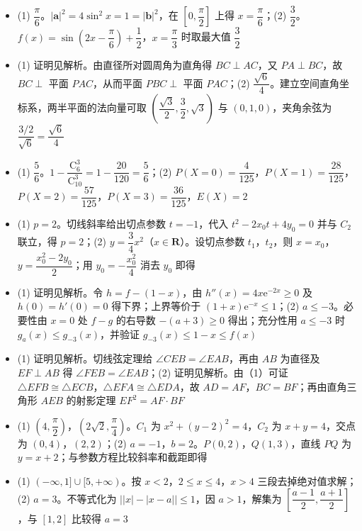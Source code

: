 \begin{itemize}[leftmargin=2.6em]
  \item[\textbf{17.}] (1) $\dfrac{\pi}6$。$|\boldsymbol a|^2=4\sin^2x=1=|\boldsymbol b|^2$，在 $\left[0,\dfrac{\pi}2\right]$ 上得 $x=\dfrac{\pi}6$；(2) $\dfrac32$。$f(x)=\sin\left(2x-\dfrac{\pi}6\right)+\dfrac12$，$x=\dfrac{\pi}3$ 时取最大值 $\dfrac32$
  \item[\textbf{18.}] (1) 证明见解析。由直径所对圆周角为直角得 $BC\perp AC$，又 $PA\perp BC$，故 $BC\perp$ 平面 $PAC$，从而平面 $PBC\perp$ 平面 $PAC$；(2) $\dfrac{\sqrt6}4$。建立空间直角坐标系，两半平面的法向量可取 $\left(\dfrac{\sqrt3}2,\dfrac32,\sqrt3\right)$ 与 $(0,1,0)$，夹角余弦为 $\dfrac{3/2}{\sqrt6}=\dfrac{\sqrt6}4$
  \item[\textbf{19.}] (1) $\dfrac56$。$1-\dfrac{\mathrm C_6^3}{\mathrm C_{10}^3}=1-\dfrac{20}{120}=\dfrac56$；(2) $P(X=0)=\dfrac4{125}$，$P(X=1)=\dfrac{28}{125}$，$P(X=2)=\dfrac{57}{125}$，$P(X=3)=\dfrac{36}{125}$，$E(X)=2$
  \item[\textbf{20.}] (1) $p=2$。切线斜率给出切点参数 $t=-1$，代入 $t^2-2x_0t+4y_0=0$ 并与 $C_2$ 联立，得 $p=2$；(2) $y=\dfrac34x^2$（$x\in\mathbf R$）。设切点参数 $t_1$，$t_2$，则 $x=x_0$，$y=\dfrac{x_0^2-2y_0}2$；用 $y_0=-\dfrac{x_0^2}4$ 消去 $y_0$ 即得
  \item[\textbf{21.}] (1) 证明见解析。令 $h=f-(1-x)$，由 $h''(x)=4x\mathrm e^{-2x}\geqslant0$ 及 $h(0)=h'(0)=0$ 得下界；上界等价于 $(1+x)\mathrm e^{-x}\leqslant1$；(2) $a\leqslant-3$。必要性由 $x=0$ 处 $f-g$ 的右导数 $-(a+3)\geqslant0$ 得出；充分性用 $a\leqslant-3$ 时 $g_a(x)\leqslant g_{-3}(x)$，并验证 $g_{-3}(x)\leqslant1-x\leqslant f(x)$
\end{itemize}

\begin{itemize}[leftmargin=2.6em]
  \item[\textbf{22.}] (1) 证明见解析。切线弦定理给 $\angle CEB=\angle EAB$，再由 $AB$ 为直径及 $EF\perp AB$ 得 $\angle FEB=\angle EAB$；(2) 证明见解析。由（1）可证 $\triangle EFB\cong\triangle ECB$，$\triangle EFA\cong\triangle EDA$，故 $AD=AF$，$BC=BF$；再由直角三角形 $AEB$ 的射影定理 $EF^2=AF\cdot BF$
  \item[\textbf{23.}] (1) $(4,\dfrac{\pi}2)$，$(2\sqrt2,\dfrac{\pi}4)$。$C_1$ 为 $x^2+(y-2)^2=4$，$C_2$ 为 $x+y=4$，交点为 $(0,4)$，$(2,2)$；(2) $a=-1$，$b=2$。$P(0,2)$，$Q(1,3)$，直线 $PQ$ 为 $y=x+2$；与参数方程比较斜率和截距即得
  \item[\textbf{24.}] (1) $(-\infty,1]\cup[5,+\infty)$。按 $x<2$，$2\leqslant x\leqslant4$，$x>4$ 三段去掉绝对值求解；(2) $a=3$。不等式化为 $\bigl||x|-|x-a|\bigr|\leqslant1$，因 $a>1$，解集为 $\left[\dfrac{a-1}2,\dfrac{a+1}2\right]$，与 $[1,2]$ 比较得 $a=3$
\end{itemize}
